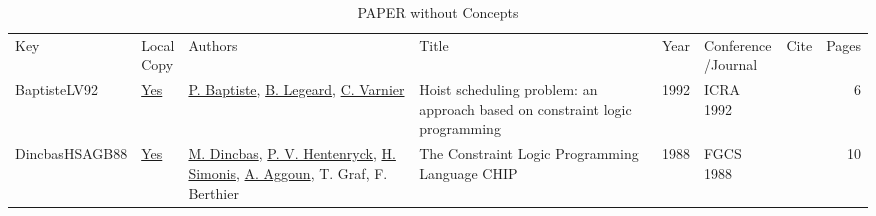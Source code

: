 {\scriptsize
\begin{longtable}{llp{5cm}p{10cm}rp{3cm}lr}
\rowcolor{white}\caption{PAPER without Concepts}\\ \toprule
\rowcolor{white}Key & \shortstack{Local\\Copy} & Authors & Title & Year & \shortstack{Conference\\/Journal} & Cite & Pages\\ \midrule
\endhead
\bottomrule
\endfoot
BaptisteLV92 & \href{../works/BaptisteLV92.pdf}{Yes} & \hyperref[auth:a693]{P. Baptiste}, \hyperref[auth:a694]{B. Legeard}, \hyperref[auth:a692]{C. Varnier} & Hoist scheduling problem: an approach based on constraint logic programming & 1992 & ICRA 1992 & \cite{BaptisteLV92} & 6\\DincbasHSAGB88 & \href{../works/DincbasHSAGB88.pdf}{Yes} & \hyperref[auth:a717]{M. Dincbas}, \hyperref[auth:a148]{P. V. Hentenryck}, \hyperref[auth:a17]{H. Simonis}, \hyperref[auth:a725]{A. Aggoun}, T. Graf, F. Berthier & The Constraint Logic Programming Language {CHIP} & 1988 & FGCS 1988 & \cite{DincbasHSAGB88} & 10\\\end{longtable}
}

